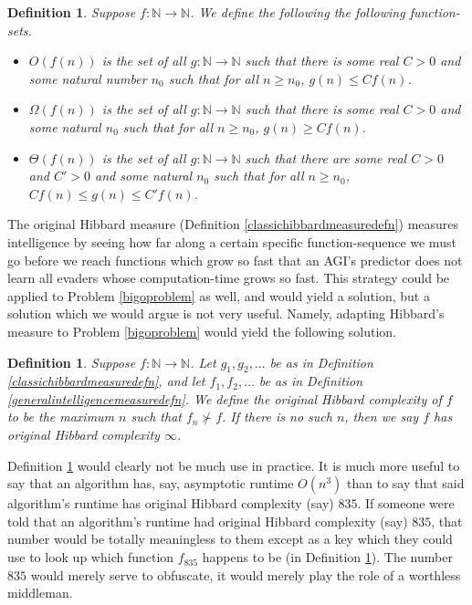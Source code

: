\documentclass{article}
\newtheorem{definition}[theorem]{Definition}
\begin{document}
\begin{definition}
\label{bigodefn}
    Suppose $f:\mathbb N\to\mathbb N$. We define the following the following function-sets.
    \begin{itemize}
        \item
        $O(f(n))$ is the set of all $g:\mathbb N\to\mathbb N$ such that
        there is some real $C>0$ and some natural number $n_0$ such that
        for all $n\geq n_0$, $g(n)\leq Cf(n)$.
        \item
        $\Omega(f(n))$ is the set of all $g:\mathbb N\to\mathbb N$ such that
        there is some real $C>0$ and some natural $n_0$ such that
        for all $n\geq n_0$, $g(n)\geq Cf(n)$.
        \item
        $\Theta(f(n))$ is the set of all $g:\mathbb N\to\mathbb N$ such that
        there are some real $C>0$ and $C'>0$ and some natural $n_0$ such that
        for all $n\geq n_0$, $Cf(n)\leq g(n)\leq C'f(n)$.
    \end{itemize}
\end{definition}

The original Hibbard measure (Definition \ref{classichibbardmeasuredefn}) measures
intelligence by seeing how far along a certain specific function-sequence we must go
before we reach functions which grow so fast that an AGI's predictor does not learn
all evaders whose computation-time grows so fast. This strategy could be applied to
Problem \ref{bigoproblem} as well, and would yield a solution, but a solution which we
would argue is not very useful. Namely, adapting Hibbard's measure to
Problem \ref{bigoproblem} would yield the following solution.

\begin{definition}
\label{originalhibbardcomplexitydefn}
    Suppose $f:\mathbb N\to\mathbb N$.
    Let $g_1,g_2,\ldots$ be as in Definition \ref{classichibbardmeasuredefn}, and let
    $f_1,f_2,\ldots$ be as in Definition \ref{generalintelligencemeasuredefn}.
    We define the \emph{original Hibbard complexity}
    of $f$ to be the maximum $n$ such that $f_n\not\succ f$. If there is no such
    $n$, then we say $f$ \emph{has original Hibbard complexity $\infty$}.
\end{definition}

Definition \ref{originalhibbardcomplexitydefn} would clearly not be much use in
practice. It is much more useful to say that an algorithm has, say, asymptotic
runtime $O(n^3)$ than to say that said algorithm's runtime has original Hibbard
complexity (say) $835$. If someone were told that an algorithm's runtime had
original Hibbard complexity (say) $835$, that number would be totally meaningless
to them except as a key which they could use to look up which function $f_{835}$
happens to be (in Definition \ref{originalhibbardcomplexitydefn}). The number
$835$ would merely serve to obfuscate, it would merely play the role of a worthless
middleman.
\end{document}
